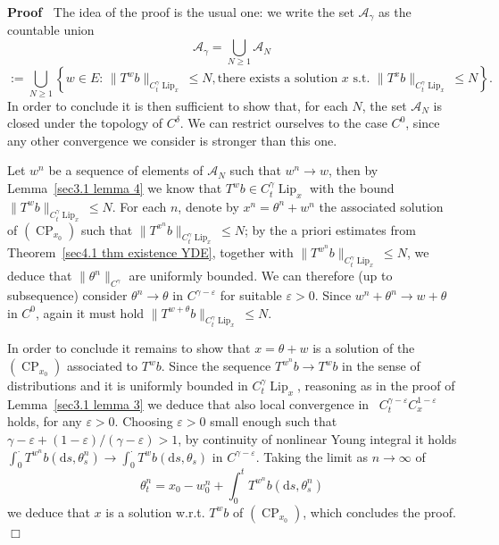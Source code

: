\documentclass[10pt]{article}
\newcommand{\assign}{:=}
\newcommand{\comma}{{,}}
\newcommand{\mathd}{\mathrm{d}}
\newcommand{\tmop}[1]{\ensuremath{\operatorname{#1}}}
\newenvironment{proof}{\noindent\textbf{Proof\ }}{\hspace*{\fill}$\Box$\medskip}
\begin{document}
\begin{proof}
  The idea of the proof is the usual one: we write the set
  $\mathcal{A}_{\gamma}$ as the countable union
  \[ \mathcal{A}_{\gamma} = \bigcup_{N \geqslant 1} \mathcal{A}_N \]
  \[ \assign \bigcup_{N \geqslant 1} \left\{ w \in E : \, \| T^w b
     \|_{C^{\gamma}_t \tmop{Lip}_x} \leqslant N, \text{there exists a solution
     $x$ s.t. } \| T^x b \|_{C^{\gamma}_t \tmop{Lip}_x} \leqslant N \right\} .
  \]
  In order to conclude it is then sufficient to show that, for each $N$, the
  set $\mathcal{A}_N$ is closed under the topology of $C^{\delta}$. We can
  restrict ourselves to the case $C^0$, since any other convergence we
  consider is stronger than this one.
  
  Let $w^n$ be a sequence of elements of $\mathcal{A}_N$ such that $w^n
  \rightarrow w$, then by Lemma~\ref{sec3.1 lemma 4} we know that $T^w b \in
  C^{\gamma}_t \tmop{Lip}_x$ with the bound $\| T^w b \|_{C^{\gamma}_t
  \tmop{Lip}_x} \leqslant N$. For each $n$, denote by $x^n = \theta^n + w^n$
  the associated solution of $(\tmop{CP}_{x_0})$ such that $\| T^{x^n} b
  \|_{C^{\gamma}_t \tmop{Lip}_x} \leqslant N$; by the a priori estimates from
  Theorem~\ref{sec4.1 thm existence YDE}, together with $\| T^{w^n} b
  \|_{C^{\gamma}_t \tmop{Lip}_x} \leqslant N$, we deduce that $\| \theta^n
  \|_{C^{\gamma}}$ are uniformly bounded. We can therefore (up to subsequence)
  consider $\theta^n \rightarrow \theta$ in $C^{\gamma - \varepsilon}$ for
  suitable $\varepsilon > 0$. Since $w^n + \theta^n \rightarrow w + \theta$ in
  $C^0$, again it must hold $\| T^{w + \theta} b \|_{C^{\gamma}_t
  \tmop{Lip}_x} \leqslant N$.
  
  In order to conclude it remains to show that $x = \theta + w$ is a solution
  of the $(\tmop{CP}_{x_0})$ associated to $T^w b$. Since the sequence
  $T^{w^n} b \rightarrow T^w b$ in the sense of distributions and it is
  uniformly bounded in $C^{\gamma}_t \tmop{Lip}_x$, reasoning as in the proof
  of Lemma~\ref{sec3.1 lemma 3} we deduce that also local convergence in \
  $C^{\gamma - \varepsilon}_t C^{1 - \varepsilon}_x$ holds, for any
  $\varepsilon > 0$. Choosing $\varepsilon > 0$ small enough such that $\gamma
  - \varepsilon + (1 - \varepsilon) / (\gamma - \varepsilon) > 1$, by
  continuity of nonlinear Young integral it holds $\int_0^{\cdot} T^{w^n} b
  (\mathd s, \theta^n_s) \rightarrow \int_0^{\cdot} T^w b (\mathd s,
  \theta_s)$ in $C^{\gamma - \varepsilon}$. Taking the limit as $n \rightarrow
  \infty$ of
  \[ \theta^n_t = x_0 - w^n_0 + \int_0^t T^{w^n} b (\mathd s \comma
     \theta^n_s) \]
  we deduce that $x$ is a solution w.r.t. $T^w b$ of $(\tmop{CP}_{x_0})$,
  which concludes the proof.
\end{proof}
\end{document}

